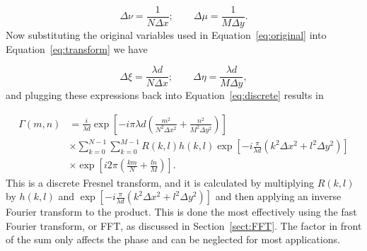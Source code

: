     \begin{equation}
        \Delta\nu=\frac{1}{N\Delta x}; \qquad \Delta\mu=\frac{1}{M\Delta y}.
        \label{eq:transform}
    \end{equation}
    Now substituting the original variables used in Equation~\ref{eq:original} into
    Equation~\ref{eq:transform} we have

    \begin{equation}
        \Delta\xi=\frac{\lambda d}{N\Delta x}; \qquad \Delta\eta=\frac{
        \lambda d}{M\Delta y},
    \end{equation}
    and plugging these expressions back into Equation~\ref{eq:discrete} results
    in

    \begin{equation}
    \begin{aligned}
        \Gamma(m,n) & = \frac{i}{\lambda d}\exp\left[ -i\pi \lambda d\left(
            \frac{m^2}{N^2\Delta x^2}+\frac{n^2}{M^2\Delta y^2}
        \right)\right]\\
        &\times
        \sum_{k=0}^{N-1}\sum_{k=0}^{M-1}R(k,l)h(k,l)\exp\left[ -i
        \frac{\pi}{\lambda d}\left( k^2\Delta x^2+l^2\Delta y^2 \right)
    \right] \\
    &\times \exp\left[ i2\pi\left( \frac{km}{N}+\frac{ln}{M} \right) \right].
    \end{aligned}
    \end{equation}
    This is a discrete Fresnel transform, and it is calculated by multiplying
    $R(k,l)$ by $h(k,l)$ and $\exp\left[ -i
        \frac{\pi}{\lambda d}\left( k^2\Delta x^2+l^2\Delta y^2 \right)
    \right]$
    and then applying an inverse Fourier transform to the product. This is done
    the most effectively using the fast Fourier transform, or FFT\@, as
    discussed in Section~\ref{sect:FFT}. The factor
    in front of the sum only affects the phase and can be neglected for
    most applications.


